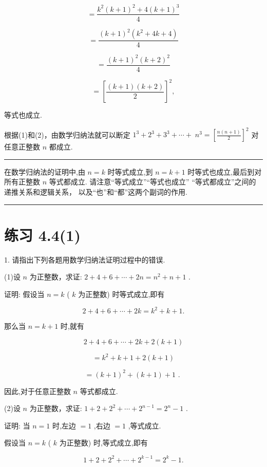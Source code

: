 \documentclass[10pt]{article}
\newcommand{\HRule}{\begin{center}\rule{0.9\linewidth}{0.2mm}\end{center}}
\newcommand*\circled[1]{\tikz[baseline=(char.base)]{\node[shape=circle,draw,inner sep=1.5pt] (char) {\small #1};}}
\begin{document}
\[
= \frac{{k}^{2}{\left( k + 1\right) }^{2} + 4{\left( k + 1\right) }^{3}}{4}
\]

\[
= \frac{{\left( k + 1\right) }^{2}\left( {{k}^{2} + {4k} + 4}\right) }{4}
\]

\[
= \frac{{\left( k + 1\right) }^{2}{\left( k + 2\right) }^{2}}{4}
\]

\[
= {\left\lbrack  \frac{\left( {k + 1}\right) \left( {k + 2}\right) }{2}\right\rbrack  }^{2},
\]

等式也成立.

根据(1)和(2)，由数学归纳法就可以断定 \({1}^{3} + {2}^{3} + {3}^{3} + \cdots  + \; {n}^{3} = {\left\lbrack  \frac{n\left( {n + 1}\right) }{2}\right\rbrack  }^{2}\) 对任意正整数 \(n\) 都成立.

\HRule

在数学归纳法的证明中,由 \(n = k\) 时等式成立,到 \(n = k + 1\) 时等式也成立,最后到对所有正整数 \(n\) 等式都成立. 请注意“等式成立”“等式也成立” “等式都成立”之间的递推关系和逻辑关系， 以及“也”和“都”这两个副词的作用.

\HRule

\section*{练习 4.4(1)}

1. 请指出下列各题用数学归纳法证明过程中的错误.

(1)设 \(n\) 为正整数，求证: \({2 + 4 + 6 + \cdots  + {2n}} = {n}^{2} + n + 1\) .

证明: 假设当 \(n = k\) ( \(k\) 为正整数) 时等式成立,即有

\[
2 + 4 + 6 + \cdots  + {2k} = {k}^{2} + k + 1.
\]

那么当 \(n = k + 1\) 时,就有

\[
2 + 4 + 6 + \cdots  + {2k} + 2\left( {k + 1}\right)
\]

\[
= {k}^{2} + k + 1 + 2\left( {k + 1}\right)
\]

\[
= {\left( k + 1\right) }^{2} + \left( {k + 1}\right)  + 1\text{ . }
\]

因此,对于任意正整数 \(n\) 等式都成立.

(2)设 \(n\) 为正整数，求证: \(1 + 2 + {2}^{2} + \cdots  + {2}^{n - 1} = {2}^{n} - 1\) .

证明:  \circled{1}  当 \(n = 1\) 时,左边 \(= 1\) ,右边 \(= 1\) ,等式成立.

 \circled{2}  假设当 \(n = k\) ( \(k\) 为正整数) 时,等式成立,即有

\[
1 + 2 + {2}^{2} + \cdots  + {2}^{k - 1} = {2}^{k} - 1.
\]
\end{document}
